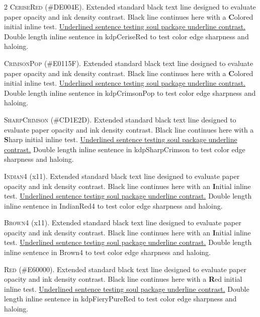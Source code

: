 \begin{multicols}{2}
\lettrine[lines=2]{\textcolor{kdpCeriseRed}{C}}{eriseRed} (\#DE004E). Extended standard black text line designed to evaluate paper opacity and ink density contrast. Black line continues here with a \textbf{\textcolor{kdpCeriseRed}{C}}olored initial inline test. \ul{Underlined sentence testing soul package underline contrast.} \textcolor{kdpCeriseRed}{Double length inline sentence in kdpCeriseRed to test color edge sharpness and haloing.}


\lettrine[lines=2]{\textcolor{kdpCrimsonPop}{C}}{rimsonPop} (\#E0115F). Extended standard black text line designed to evaluate paper opacity and ink density contrast. Black line continues here with a \textbf{\textcolor{kdpCrimsonPop}{C}}olored initial inline test. \ul{Underlined sentence testing soul package underline contrast.} \textcolor{kdpCrimsonPop}{Double length inline sentence in kdpCrimsonPop to test color edge sharpness and haloing.}


\lettrine[lines=2]{\textcolor{kdpSharpCrimson}{S}}{harpCrimson} (\#CD1E2D). Extended standard black text line designed to evaluate paper opacity and ink density contrast. Black line continues here with a \textbf{\textcolor{kdpSharpCrimson}{S}}harp initial inline test. \ul{Underlined sentence testing soul package underline contrast.} \textcolor{kdpSharpCrimson}{Double length inline sentence in kdpSharpCrimson to test color edge sharpness and haloing.}


\lettrine[lines=2]{\textcolor{IndianRed4}{I}}{ndian4} (x11). Extended standard black text line designed to evaluate paper opacity and ink density contrast. Black line continues here with an \textbf{\textcolor{IndianRed4}{I}}nitial inline test. \ul{Underlined sentence testing soul package underline contrast.} \textcolor{IndianRed4}{Double length inline sentence in IndianRed4 to test color edge sharpness and haloing.}


\lettrine[lines=2]{\textcolor{Brown4}{B}}{rown4} (x11). Extended standard black text line designed to evaluate paper opacity and ink density contrast. Black line continues here with an \textbf{\textcolor{Brown4}{I}}nitial inline test. \ul{Underlined sentence testing soul package underline contrast.} \textcolor{Brown4}{Double length inline sentence in Brown4 to test color edge sharpness and haloing.}


\lettrine[lines=2]{\textcolor{kdpFieryPureRed}{R}}{ed} (\#E60000). Extended standard black text line designed to evaluate paper opacity and ink density contrast. Black line continues here with a \textbf{\textcolor{kdpFieryPureRed}{R}}ed initial inline test. \ul{Underlined sentence testing soul package underline contrast.} \textcolor{kdpFieryPureRed}{Double length inline sentence in kdpFieryPureRed to test color edge sharpness and haloing.}



\end{multicols}
